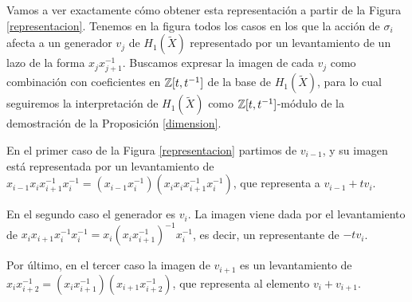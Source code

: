 \documentclass[TFG.tex]{subfiles}
\begin{document}
Vamos a ver exactamente cómo obtener esta representación a partir de la Figura \ref{representacion}. Tenemos en la figura todos los casos en los que la acción de $\sigma_i$ afecta a un generador $v_j$ de $H_1(\widetilde{X})$ representado por un levantamiento de un lazo de la forma $x_jx_{j+1}^{-1}$. Buscamos expresar la imagen de cada $v_j$ como combinación con coeficientes en $\mathbb{Z}[t,t^{-1}]$ de la base de $H_1(\widetilde{X})$, para lo cual seguiremos la interpretación de $H_1(\widetilde{X})$ como $\mathbb{Z}[t,t^{-1}]$-módulo de la demostración de la Proposición \ref{dimension}. 
%

En el primer caso de la Figura \ref{representacion} partimos de $v_{i-1}$, y su imagen está representada por un levantamiento de $x_{i-1}x_ix_{i+1}^{-1}x_i^{-1}=(x_{i-1}x_i^{-1})(x_ix_ix_{i+1}^{-1}x_i^{-1})$, que representa a $v_{i-1}+tv_i$. 

En el segundo caso el generador es $v_i$. La imagen viene dada por el levantamiento de $x_ix_{i+1}x_i^{-1}x_i^{-1}=x_i(x_ix_{i+1}^{-1})^{-1}x_i^{-1}$, es decir, un representante de $-tv_i$. 

Por último, en el tercer caso la imagen de $v_{i+1}$ es un levantamiento de $x_ix_{i+2}^{-1}=(x_ix_{i+1}^{-1})(x_{i+1}x_{i+2}^{-1})$, que representa al elemento $v_i+v_{i+1}$.
\end{document}
